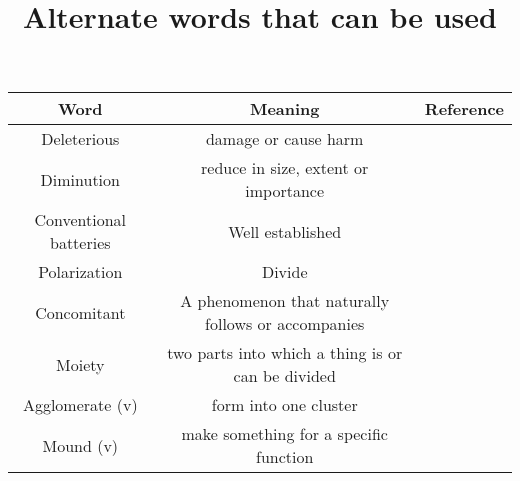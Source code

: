 \documentclass[12pt]{article}
\title{Alternate words that can be used}
\author{}
\begin{document}
\maketitle

\begin{abstract}

\end{abstract}

\begin{tabular}{|c|c|c|}
\hline
Word  & Meaning & Reference\\
\hline
Deleterious & damage or cause harm & \cite{Ghamouss2012}\\
Diminution & reduce in size, extent or importance & \cite{Ghamouss2012}\\
Conventional batteries & Well established & \cite{Ohkuma2013}\\
Polarization & Divide & \cite{Ohkuma2013}\\
Concomitant & A phenomenon that naturally follows or accompanies & \cite{Aetukuri2014a}\\
Moiety & two parts into which a thing is or can be divided & \cite{Morgan2014}\\
Agglomerate (v) & form into one cluster & \\
Mound (v) & make something for a specific function & \\
\hline
\end{tabular}
\newpage 


\end{document}
